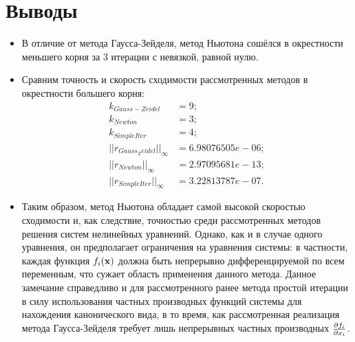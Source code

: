 \documentclass[14pt, a4paper]{article}
\begin{document}
  \section{Выводы}
  \begin{itemize}
  \item
  В отличие от метода Гаусса-Зейделя, метод Ньютона сошёлся в окрестности меньшего корня за 3 итерации с невязкой, равной нулю.
  \item
  Сравним точность и скорость сходимости рассмотренных методов в окрестности большего корня:
  \begin{align*}
  k_{Gauss-Zeidel} &= 9; \\
  k_{Newton} &= 3; \\
  k_{SimpleIter} &= 4; \\
  ||r_{Gauss_Zeidel}||_{\infty} &= 6.98076505e-06; \\
  ||r_{Newton}||_{\infty} &= 2.97095681e-13; \\
  ||r_{SimpleIter}||_{\infty} &= 3.22813787e-07.
  \end{align*}
  \item
  Таким образом, метод Ньютона обладает самой высокой скоростью сходимости и, как следствие, точностью среди рассмотренных методов решения систем нелинейных уравнений. Однако, как и в случае одного уравнения, он предполагает ограничения на уравнения системы: в частности, каждая функция $f_i(\bold{x})$ должна быть непрерывно дифференцируемой по всем переменным, что сужает область применения данного метода. Данное замечание справедливо и для рассмотренного ранее метода простой итерации в силу использования частных производных функций системы для нахождения канонического вида, в то время, как рассмотренная реализация метода Гаусса-Зейделя требует лишь непрерывных частных производных $\pdv{f_i}{x_i}$.
  \end{itemize}
\end{document}
